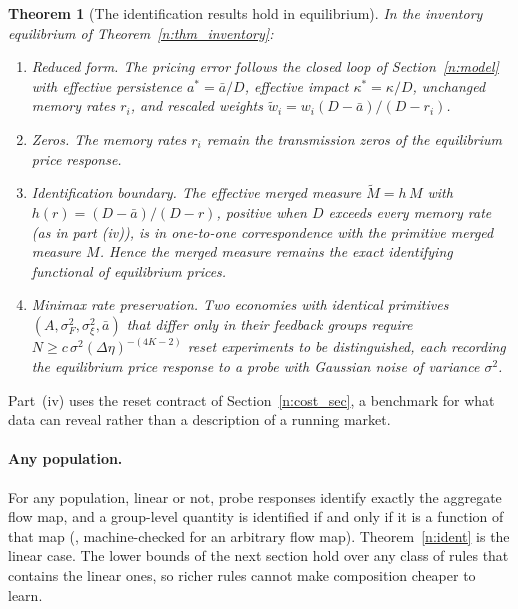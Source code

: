 \documentclass[12pt]{article}
\newtheorem{theorem}{Theorem}[section]
\theoremstyle{definition}
\theoremstyle{remark}
\begin{document}
\begin{theorem}[The identification results hold in equilibrium]\label{n:thm_eqreduced}
In the inventory equilibrium of Theorem~\ref{n:thm_inventory}:
\begin{enumerate}[label=(\roman*),itemsep=1pt]
\item \emph{Reduced form.} The pricing error follows the closed loop of Section~\ref{n:model} with effective persistence $a^*=\bar a/D$, effective impact $\kappa^*=\kappa/D$, unchanged memory rates $r_i$, and rescaled weights $\tilde w_i=w_i(D-\bar a)/(D-r_i)$.
\item \emph{Zeros.} The memory rates $r_i$ remain the transmission zeros of the equilibrium price response.
\item \emph{Identification boundary.} The effective merged measure $\tilde M=h\,M$ with $h(r)=(D-\bar a)/(D-r)$, positive when $D$ exceeds every memory rate (as in part (iv)), is in one-to-one correspondence with the primitive merged measure $M$. Hence the merged measure remains the exact identifying functional of equilibrium prices.
\item \emph{Minimax rate preservation.} Two economies with identical primitives $(A,\sigma_F^2,\sigma_\xi^2,\bar a)$ that differ only in their feedback groups require $N\ge c\,\sigma^2(\Delta\eta)^{-(4K-2)}$ reset experiments to be distinguished, each recording the equilibrium price response to a probe with Gaussian noise of variance $\sigma^2$.
\end{enumerate}
\end{theorem}

Part~(iv) uses the reset contract of Section~\ref{n:cost_sec}, a benchmark for what data can reveal rather than a description of a running market.


\paragraph{Any population.} For any population, linear or not, probe responses identify exactly the aggregate flow map, and a group-level quantity is identified if and only if it is a function of that map (\citealp[Theorem~S6.7]{niroula2026full}, machine-checked for an arbitrary flow map). Theorem~\ref{n:ident} is the linear case. The lower bounds of the next section hold over any class of rules that contains the linear ones, so richer rules cannot make composition cheaper to learn.
\end{document}
